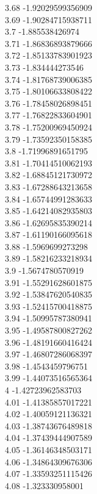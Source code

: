 {3.68	-1.92029599356909\\
3.69	-1.90284715938711\\
3.7	-1.885538426974\\
3.71	-1.86836893879666\\
3.72	-1.85133783901923\\
3.73	-1.834444273546\\
3.74	-1.81768739006385\\
3.75	-1.80106633808422\\
3.76	-1.78458026898451\\
3.77	-1.76822833604901\\
3.78	-1.75200969450924\\
3.79	-1.73592350158385\\
3.8	-1.71996891651795\\
3.81	-1.70414510062193\\
3.82	-1.68845121730972\\
3.83	-1.67288643213658\\
3.84	-1.65744991283633\\
3.85	-1.64214082935803\\
3.86	-1.62695835390214\\
3.87	-1.61190166095618\\
3.88	-1.5969699273298\\
3.89	-1.58216233218934\\
3.9	-1.5674780570919\\
3.91	-1.55291628601875\\
3.92	-1.53847620540835\\
3.93	-1.52415700418875\\
3.94	-1.50995787380941\\
3.95	-1.49587800827262\\
3.96	-1.48191660416424\\
3.97	-1.46807286068397\\
3.98	-1.4543459796751\\
3.99	-1.44073516565364\\
4	-1.42723962583703\\
4.01	-1.41385857017221\\
4.02	-1.40059121136321\\
4.03	-1.38743676489818\\
4.04	-1.37439444907589\\
4.05	-1.36146348503171\\
4.06	-1.34864309676306\\
4.07	-1.33593251115426\\
4.08	-1.323330958001\\
}
